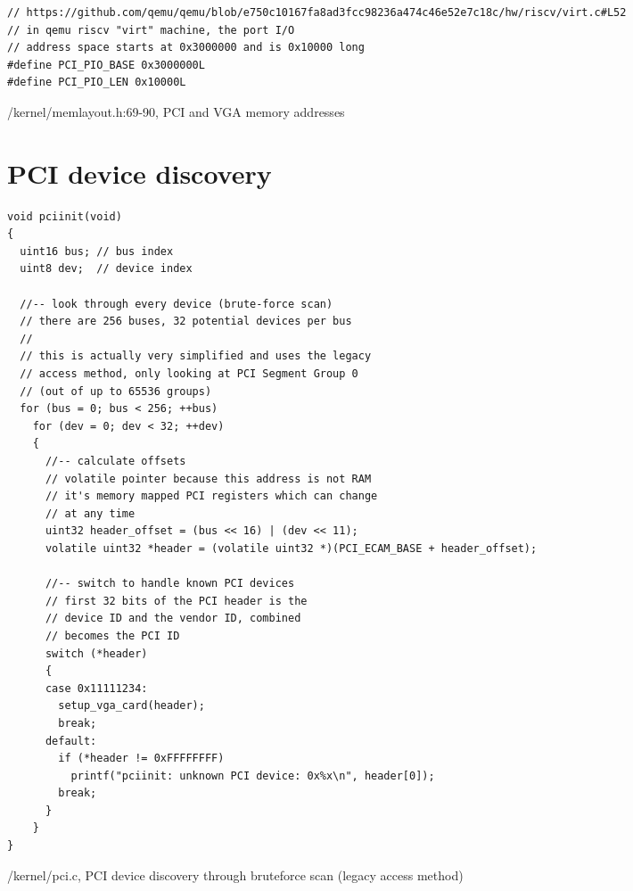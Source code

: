 \begin{appendices}
\begin{listing}[H]
\begin{verbatim}
// https://github.com/qemu/qemu/blob/e750c10167fa8ad3fcc98236a474c46e52e7c18c/hw/riscv/virt.c#L52
// in qemu riscv "virt" machine, the port I/O
// address space starts at 0x3000000 and is 0x10000 long
#define PCI_PIO_BASE 0x3000000L
#define PCI_PIO_LEN 0x10000L
\end{verbatim}
\caption{/kernel/memlayout.h:69-90, PCI and VGA memory addresses}
\end{listing}

\section{PCI device discovery}
\label{appendix:c:3}
\begin{listing}[H]
    \begin{verbatim}
void pciinit(void)
{
  uint16 bus; // bus index
  uint8 dev;  // device index

  //-- look through every device (brute-force scan)
  // there are 256 buses, 32 potential devices per bus
  //
  // this is actually very simplified and uses the legacy
  // access method, only looking at PCI Segment Group 0
  // (out of up to 65536 groups)
  for (bus = 0; bus < 256; ++bus)
    for (dev = 0; dev < 32; ++dev)
    {
      //-- calculate offsets
      // volatile pointer because this address is not RAM
      // it's memory mapped PCI registers which can change
      // at any time
      uint32 header_offset = (bus << 16) | (dev << 11);
      volatile uint32 *header = (volatile uint32 *)(PCI_ECAM_BASE + header_offset);

      //-- switch to handle known PCI devices
      // first 32 bits of the PCI header is the
      // device ID and the vendor ID, combined
      // becomes the PCI ID
      switch (*header)
      {
      case 0x11111234:
        setup_vga_card(header);
        break;
      default:
        if (*header != 0xFFFFFFFF)
          printf("pciinit: unknown PCI device: 0x%x\n", header[0]);
        break;
      }
    }
}
    \end{verbatim}
    \caption{/kernel/pci.c, PCI device discovery through bruteforce scan (legacy access method)}
\end{listing}


\end{appendices}
